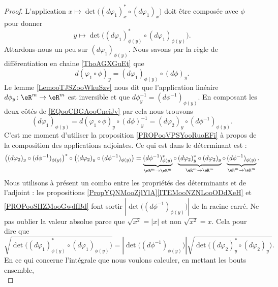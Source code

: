 \begin{proof}
    L'application \( x\mapsto \det\big( (d\varphi_1)_x^*\circ(d\varphi_1)_x \big)\) doit être composée avec \( \phi\) pour donner
    \begin{equation}
        y\mapsto\det\big( (d\varphi_1)_{\phi(y)}^*\circ(d\varphi_1)_{\phi(y)} \big).
    \end{equation}
    Attardons-nous un peu sur \( (d\varphi_1)_{\phi(y)}\). Nous savons par la règle de différentiation en chaine \ref{ThoAGXGuEt} que
    \begin{equation}        \label{EQooCBGAooCneiJv}
        d(\varphi_1\circ \phi)_y=(d\varphi_1)_{\phi(y)}\circ(d\phi)_y.
    \end{equation}
    Le lemme \ref{LemooTJSZooWkuSzv} nous dit que l'application linéaire \( d\phi_y\colon \eR^m\to \eR^m\) est inversible et que \( d\phi_y^{-1}=(d\phi^{-1})_{\phi(y)}\). En composant les deux côtés de \eqref{EQooCBGAooCneiJv} par cela nous trouvons
    \begin{equation}
        (d\varphi_1)_{\phi(y)}=d(\varphi_1\circ\phi)_y\circ(d\phi)_y^{-1}=(d\varphi_2)_y\circ(d\phi^{-1})_{\phi(y)}.
    \end{equation}
    C'est me moment d'utiliser la proposition \ref{PROPooVPSYooRuoEFi} à propos de la composition des applications adjointes. Ce qui est dans le déterminant est :
    \begin{equation}
        \big( (d\varphi_2)_y\circ(d\phi^{-1})_{\phi(y)} \big)^*\circ\big( (d\varphi_2)_y\circ(d\phi^{-1})_{\phi(y)} \big)=
        \underbrace{(d\phi^{-1})_{\phi(y)}^*}_{\eR^m\to \eR^m}\circ\underbrace{(d\varphi_2)^*_y\circ(d\varphi_2)_y}_{\eR^m\to \eR^m}\circ\underbrace{(d\phi^{-1})_{\phi(y)}}_{\eR^m\to \eR^m}.
    \end{equation}
    Nous utilisons à présent un combo entre les propriétés des déterminants et de l'adjoint : les propositions \ref{PropYQNMooZjlYlA}\ref{ITEMooNZNLooODdXeH} et \ref{PROPooSHZMooGwdfBd} font sortir \( | \det\big( (d\phi^{-1})_{\phi(y)} \big) |\) de la racine carré. Ne pas oublier la valeur absolue parce que \( \sqrt{ x^2 }=| x |\) et non \( \sqrt{ x^2 }=x\). Cela pour dire que
    \begin{equation}
        \sqrt{ \det\big( (d\varphi_1)_{\phi(y)}^*\circ(d\varphi_1)_{\phi(y)} \big) }=| \det\big( (d\phi^{-1})_{\phi(y)} \big) |\sqrt{ \det\big( (d\varphi_2)_y^*\circ(d\varphi_2)_y \big) }.
    \end{equation}
    En ce qui concerne l'intégrale que nous voulons calculer, en mettant les bouts ensemble,
    \begin{equation}

\end{equation}
\end{proof}
